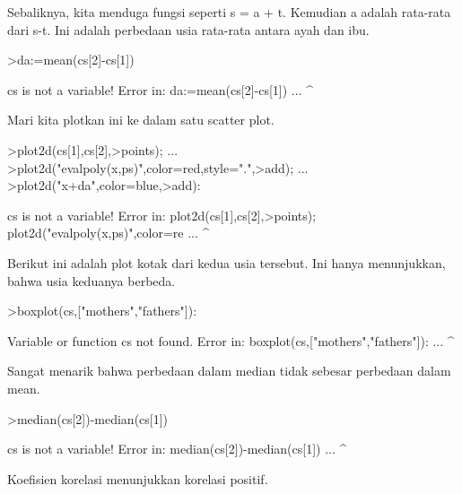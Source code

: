 \documentclass[a4paper,10pt]{article}
\begin{document}
\begin{eulernotebook}
\begin{eulercomment}
\begin{eulercomment}
\begin{eulercomment}
\begin{eulercomment}
\begin{eulercomment}
\begin{eulercomment}
\begin{eulercomment}
\begin{eulercomment}
\begin{eulercomment}
\begin{eulercomment}
\begin{eulercomment}
\begin{eulercomment}
\begin{eulercomment}
\begin{eulercomment}
\begin{eulercomment}
\begin{eulercomment}
\begin{eulercomment}
\begin{eulercomment}
\begin{eulercomment}
Sebaliknya, kita menduga fungsi seperti s = a + t. Kemudian a adalah
rata-rata dari s-t. Ini adalah perbedaan usia rata-rata antara ayah
dan ibu.
\end{eulercomment}
\begin{eulerprompt}
>da:=mean(cs[2]-cs[1])
\end{eulerprompt}
\begin{euleroutput}
  cs is not a variable!
  Error in:
  da:=mean(cs[2]-cs[1]) ...
                ^
\end{euleroutput}
\begin{eulercomment}
Mari kita plotkan ini ke dalam satu scatter plot.
\end{eulercomment}
\begin{eulerprompt}
>plot2d(cs[1],cs[2],>points);  ...
>plot2d("evalpoly(x,ps)",color=red,style=".",>add);  ...
>plot2d("x+da",color=blue,>add):
\end{eulerprompt}
\begin{euleroutput}
  cs is not a variable!
  Error in:
  plot2d(cs[1],cs[2],>points);  plot2d("evalpoly(x,ps)",color=re ...
              ^
\end{euleroutput}
\begin{eulercomment}
Berikut ini adalah plot kotak dari kedua usia tersebut. Ini hanya
menunjukkan, bahwa usia keduanya berbeda.
\end{eulercomment}
\begin{eulerprompt}
>boxplot(cs,["mothers","fathers"]):
\end{eulerprompt}
\begin{euleroutput}
  Variable or function cs not found.
  Error in:
  boxplot(cs,["mothers","fathers"]): ...
            ^
\end{euleroutput}
\begin{eulercomment}
Sangat menarik bahwa perbedaan dalam median tidak sebesar perbedaan
dalam mean.
\end{eulercomment}
\begin{eulerprompt}
>median(cs[2])-median(cs[1])
\end{eulerprompt}
\begin{euleroutput}
  cs is not a variable!
  Error in:
  median(cs[2])-median(cs[1]) ...
              ^
\end{euleroutput}
\begin{eulercomment}
Koefisien korelasi menunjukkan korelasi positif.
\end{eulercomment}
\begin{eulerprompt}

\end{eulerprompt}
\end{eulercomment}
\end{eulercomment}
\end{eulercomment}
\end{eulercomment}
\end{eulercomment}
\end{eulercomment}
\end{eulercomment}
\end{eulercomment}
\end{eulercomment}
\end{eulercomment}
\end{eulercomment}
\end{eulercomment}
\end{eulercomment}
\end{eulercomment}
\end{eulercomment}
\end{eulercomment}
\end{eulercomment}
\end{eulercomment}
\end{eulernotebook}
\end{document}
